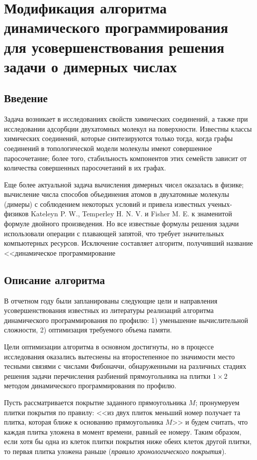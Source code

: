 \chapter{Модификация алгоритма динамического программирования для усовершенствования решения задачи о димерных числах}

\section{Введение}

Задача возникает в исследованиях свойств химических соединений, а также при исследовании адсорбции двухатомных молекул на поверхности. 
Известны классы химических соединений, которые синтезируются только тогда, когда графы соединений в топологической модели молекулы имеют совершенное паросочетание; более того, стабильность компонентов этих семейств зависит от количества совершенных паросочетаний в их графах.

Еще более актуальной задача вычисления димерных чисел оказалась в физике; вычисление числа способов объединения атомов в двухатомные молекулы (димеры) с соблюдением некоторых условий и привела известных ученых-физиков Kateleyn P. W., Temperley H. N. V. и Fisher M. E. к знаменитой формуле двойного произведения. Но все известные формулы решения задачи использовали операции с плавающей запятой, что требует значительных компьютерных ресурсов.
Исключение составляет алгоритм, получивший название <<динамическое программирование

\section{Описание алгоритма}

В отчетном году были запланированы следующие цели и направления усовершенствования известных из литературы реализаций алгоритма динамического программирования по профилю: 1) уменьшение вычислительной сложности, 2) оптимизация требуемого объема памяти.

Цели оптимизации алгоритма в основном достигнуты, но в процессе исследования оказались вытеснены на второстепенное по значимости место тесными связями с числами Фибоначчи, обнаруженными на различных стадиях решения задачи перечисления разбиений прямоугольника на плитки $1\times 2$ методом динамического программирования по профилю.

Пусть рассматривается покрытие заданного прямоугольника $M$; пронумеруем плитки покрытия по правилу: <<из двух плиток меньший номер получает та плитка, которая ближе к основанию прямоугольника $M$>> и будем считать, что каждая плитка уложена в момент времени, равный ее номеру. Таким образом, если  хотя бы одна из клеток плитки покрытия ниже обеих клеток другой плитки, то первая плитка уложена раньше  (\textit{правило хронологического покрытия}).

